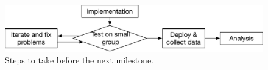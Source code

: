 \documentclass{article}
\begin{document}
\begin{figure}[htb]
  \centering
  \vspace{-3mm}
	\includegraphics[width=0.9\columnwidth]{workflow}
  \vspace{-3mm}
  \caption{
	Steps to take before the next milestone.}
  \label{fig:workflow}  
  \vspace{-3mm}
\end{figure}

\end{document}
